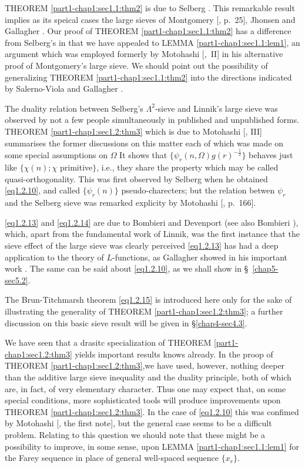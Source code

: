 THEOREM \ref{part1-chap1:sec1.1:thm2} is due to Selberg \cite{key77}. This
remarkable result implies as 
its speical cases the large sieves of Montgomery [\cite{key48}, p.~25], Jhonsen
\cite{key35} and Gallagher \cite{key16}. Our proof of THEOREM
\ref{part1-chap1:sec1.1:thm2}  has a 
difference from Selberg's in that we have appealed to LEMMA
\ref{part1-chap1:sec1.1:lem1}, an 
argument which was employed formerly by Motohashi [\cite{key54},~II] in his
alternative proof of Montgomery's large sieve. We should\pageoriginale
point out the 
possibility of generalizing THEOREM \ref{part1-chap1:sec1.1:thm2} into
the directions indicated 
by Salerno-Viola \cite{key67} and Gallagher \cite{key17}. 

The duality relation between Selberg's $\Lambda^2$-sieve and Linnik's
large sieve was observed by not a few people simultaneously in
published and unpublished forms. THEOREM \ref{part1-chap1:sec1.2:thm3}
which is due to Motohashi 
[\cite{key54}, III] summarises the former discussions on this matter each of
which was made on some special assumptions on $\Omega$ It shows that $
\{ \psi_r (n,\Omega) g (r)^{-\frac{1}{2}} \}$  behaves just like
$\{\chi(n); \chi$ primitive$\}$, i.e., they share the property which
may be called quasi-orthogonality. This was first observed by Selberg
\cite{key76} when he obtained \eqref{eq1.2.10}, and called $\{ \psi_r (n)\}$
pseudo-charecters; but the relation betwen $\psi_r$ and the Selberg
sieve was remarked explicity by Motohashi [\cite{key58}, p.~166]. 

\eqref{eq1.2.13} and \eqref{eq1.2.14} are due to Bombieri
and Devenport \cite{key8} (see 
also Bombieri \cite{key4}), which, apart from the fundamental work \cite{key45} of
Linnik, was the first instance that the sieve effect of the large
sieve was clearly perceived \eqref{eq1.2.13} has had a deep
application to the theory of $L$-functions, as Gallagher showed in his
important work \cite{key15}. The same can be said about
\eqref{eq1.2.10}, as we shall show in \S\ \ref{chap5-sec5.2}. 

The Brun-Titchmarsh theorem \eqref{eq1.2.15} is introduced here
only for the 
sake of illustrating the generality of THEOREM
\ref{part1-chap1:sec1.2:thm3}; a further\pageoriginale 
discussion on this basic sieve result will be given in
\S \ref{chap4-sec4.3}.  

We have seen that a drasitc specialization of THEOREM
\ref{part1-chap1:sec1.2:thm3} yields 
important results knows already. In the proop of THEOREM
\ref{part1-chap1:sec1.2:thm3},we have 
used, however, nothing deeper than the additive large sieve inequality
and the duality principle, both of which are, in fact, of very
elementary character. Thus one may expect that, on some special
conditions, more sophisticated tools will produce improvements upon
THEOREM \ref{part1-chap1:sec1.2:thm3}. In the case of
\eqref{eq1.2.10} this was confimed by Motohashi 
[\cite{key54}, the first note], but the general case seems to be a difficult
problem. Relating to this question we should note that these might be a
possibility to improve, in some sense, upon LEMMA
\ref{part1-chap1:sec1.1:lem1} for the Farey 
sequence in place of general well-spaced sequence $\{ x_r\}$.   

